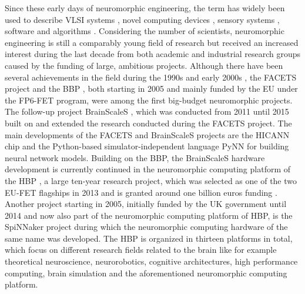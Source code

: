 Since these early days of neuromorphic engineering, the term has widely been used to describe \ac{VLSI} systems \parencite{Mead1989}, novel computing devices \parencite{Schemmel2010}, sensory systems \parencite{Lichtsteiner2008, Liu2010}, software \parencite{Davison2008, Bekolay2014} and algorithms \parencite{ReverterValeiras2016}.
Considering the number of scientists, neuromorphic engineering is still a comparably young field of research but received an increased interest during the last decade from both academic and industrial research groups caused by the funding of large, ambitious projects.
Although there have been several achievements in the field during the 1990s \parencite{Mead1989, Mahowald1992, Indiveri1997, Cauwenberghs1998} and early 2000s \parencite{Liu2002}, the \ac{FACETS} project  and the \ac{BBP} , both starting in 2005 and mainly funded by the \ac{EU} under the FP6-\ac{FET} program, were among the first big-budget neuromorphic projects.
The follow-up project \ac{BrainScaleS}  \parencite{Schemmel2010}, which was conducted from \num{2011} until \num{2015} built on and extended the research conducted during the \ac{FACETS} project.
The main developments of the \ac{FACETS} and \ac{BrainScaleS} projects are the \ac{HICANN} chip \parencite{Schemmel2010} and the Python-based simulator-independent language \ac{PyNN} \parencite{Davison2008} for building neural network models.
Building on the \acl{BBP}, the \ac{BrainScaleS} hardware development is currently continued in the neuromorphic computing platform of the \ac{HBP} , a large ten-year research project, which was selected as one of the two \ac{EU}-\ac{FET} flagships in 2013 and is granted around one billion euros funding \parencite{Calimera2013}.
Another project starting in \num{2005}, initially funded by the UK government until 2014 and now also part of the neuromorphic computing platform of \ac{HBP}, is the \ac{SpiNNaker} project \parencite{Furber2014} during which the neuromorphic computing hardware of the same name was developed.
The \ac{HBP} is organized in thirteen platforms in total, which focus on different research fields related to the brain like for example theoretical neuroscience, neurorobotics, cognitive architectures, high performance computing, brain simulation and the aforementioned neuromorphic computing platform.

